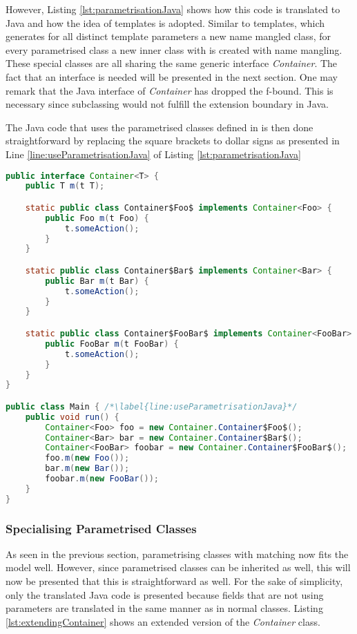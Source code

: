 However, Listing \ref{lst:parametrisationJava} shows
how this code is translated to Java and how the idea of templates is
adopted. Similar to \cpp templates, which generates for all distinct
template parameters a new name mangled class, for every parametrised
class a new inner class with is created with name mangling.
These special classes are all sharing the same generic
interface \emph{Container}. The fact that an interface is needed will be
presented in the next section. One may remark that the Java interface
of \emph{Container} has dropped the f-bound. This is necessary since
subclassing would not fulfill the extension boundary in Java.

The Java code that uses the parametrised classes defined in \ooplss is
then done straightforward by replacing the square brackets to dollar
signs as presented in Line \ref{line:useParametrisationJava} of Listing
\ref{lst:parametrisationJava}

\begin{lstlisting}[language=java,caption=Container class translated to Java,label=lst:parametrisationJava]
public interface Container<T> {
	public T m(t T);

	static public class Container$Foo$ implements Container<Foo> {
		public Foo m(t Foo) {
			t.someAction();
		}
	}

	static public class Container$Bar$ implements Container<Bar> {
		public Bar m(t Bar) {
			t.someAction();
		}
	}

	static public class Container$FooBar$ implements Container<FooBar> {
		public FooBar m(t FooBar) {
			t.someAction();
		}
	}
}

public class Main { /*\label{line:useParametrisationJava}*/
	public void run() {
		Container<Foo> foo = new Container.Container$Foo$();
		Container<Bar> bar = new Container.Container$Bar$();
		Container<FooBar> foobar = new Container.Container$FooBar$();
		foo.m(new Foo());
		bar.m(new Bar());
		foobar.m(new FooBar());
	}
}
\end{lstlisting}

\subsubsection{Specialising Parametrised Classes}
As seen in the previous section, parametrising classes with matching
now fits the model well. However, since parametrised classes
can be inherited as well, this will now be presented that this
is straightforward as well. For the sake of simplicity, only the
translated Java code is presented because fields that are not using
parameters are translated in the same manner as in normal classes.
Listing \ref{lst:extendingContainer} shows an extended version of the
\emph{Container} class.

